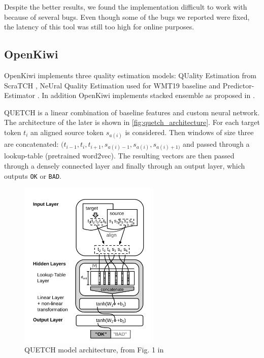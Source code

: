 Despite the better results, we found the implementation difficult to work with because of several bugs. Even though some of the bugs we reported were fixed, the latency of this tool was still too high for online purposes.

\subsection{OpenKiwi} \label{subsec:openkiwi}

OpenKiwi \citep{openkiwi} implements three quality estimation models: QUality Estimation from ScraTCH \citep{kreutzer-quetch:2015}, NeUral Quality Estimation \citep{martins-unbabel:2016} used for WMT19 baseline and Predictor-Estimator \citep{Kim-Postech:2017}. In addition OpenKiwi implements stacked ensemble as proposed in \cite{martins-ms:2017}.

QUETCH is a linear combination of baseline features and custom neural network. The architecture of the later is shown in \autoref{fig:quetch_architecture}. For each target token $t_i$ an aligned source token $s_{a(i)}$ is considered. Then windows of size three are concatenated: $(t_{i-1}, t_i, t_{i+1}, s_{a(i)-1}, s_{a(i)}, s_{a(i)+1)}$ and passed through a lookup-table (pretrained word2vec). The resulting vectors are then passed through a densely connected layer and finally through an output layer, which outputs \texttt{OK} or \texttt{BAD}.

\begin{figure}[ht]
  \centering
  \includegraphics[width=0.6\textwidth, angle=0]{img/quality_estimation/quetch_architecture_pdfa1a.pdf}
  \caption{\label{fig:quetch_architecture} QUETCH model architecture, from Fig. 1 in \citep{kreutzer-quetch:2015}}
\end{figure}

